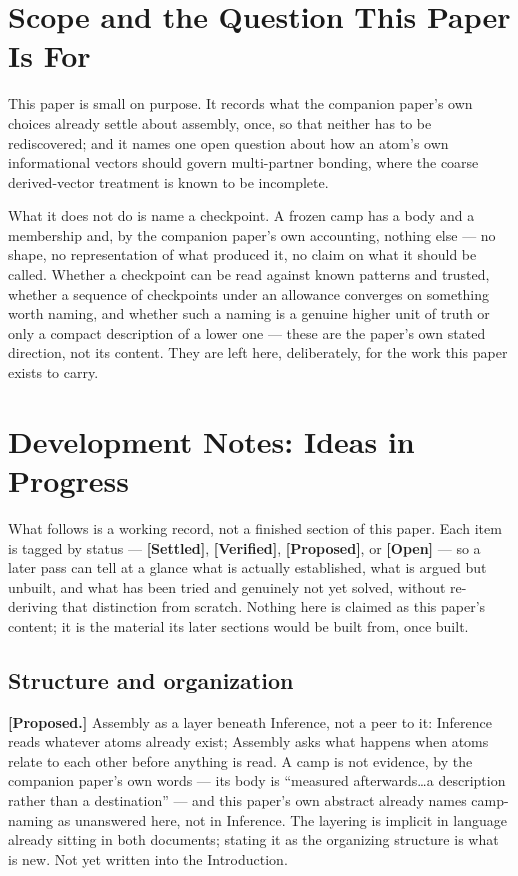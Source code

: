 \documentclass[12pt, a4paper]{article}
\begin{document}
\section{Scope and the Question This Paper Is For}
\label{sec:scope}

This paper is small on purpose. It records what the companion
paper's own choices already settle about assembly, once, so that
neither has to be rediscovered; and it names one open question about
how an atom's own informational vectors should govern multi-partner bonding, where
the coarse derived-vector treatment is known to be incomplete.

What it does not do is name a checkpoint. A frozen camp has a body
and a membership and, by the companion paper's own accounting,
nothing else --- no shape, no representation of what produced it,
no claim on what it should be called. Whether a checkpoint can be
read against known patterns and trusted, whether a sequence of
checkpoints under an allowance converges on something worth naming,
and whether such a naming is a genuine higher unit of truth or only
a compact description of a lower one --- these are the paper's own
stated direction, not its content. They are left here, deliberately,
for the work this paper exists to carry.

\section*{Development Notes: Ideas in Progress}

What follows is a working record, not a finished section of this
paper. Each item is tagged by status --- \textbf{[Settled]},
\textbf{[Verified]}, \textbf{[Proposed]}, or \textbf{[Open]} --- so a
later pass can tell at a glance what is actually established, what
is argued but unbuilt, and what has been tried and genuinely not
yet solved, without re-deriving that distinction from scratch.
Nothing here is claimed as this paper's content; it is the material
its later sections would be built from, once built.

\subsection*{Structure and organization}

\textbf{[Proposed.]} Assembly as a layer beneath Inference, not a
peer to it: Inference reads whatever atoms already exist; Assembly
asks what happens when atoms relate to each other before anything
is read. A camp is not evidence, by the companion paper's own words
--- its body is ``measured afterwards\ldots a description rather
than a destination'' --- and this paper's own abstract already names
camp-naming as unanswered here, not in Inference. The layering is
implicit in language already sitting in both documents; stating it
as the organizing structure is what is new. Not yet written into
the Introduction.
\end{document}

